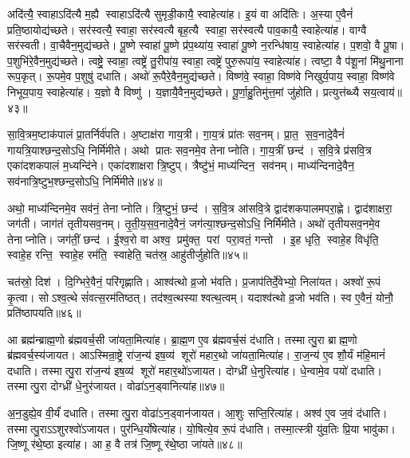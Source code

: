 अदि॑त्यै॒ स्वाहाऽदि॑त्यै म॒ह्यै स्वाहाऽदि॑त्यै सुमृडी॒कायै॒ स्वाहेत्या॑ह। इ॒यं वा अदि॑तिः। अ॒स्या ए॒वैनं॑ प्रति॒ष्ठायोद्य॑च्छते। सर॑स्वत्यै॒ स्वाहा॒ सर॑स्वत्यै बृह॒त्यै स्वाहा॒ सर॑स्वत्यै पाव॒कायै॒ स्वाहेत्या॑ह। वाग्वै सर॑स्वती। वा॒चैवैन॒मुद्य॑च्छते। पू॒ष्णे स्वाहा॑ पू॒ष्णे प्र॑प॒थ्या॑य॒ स्वाहा॑ पू॒ष्णे न॒रन्धि॑षाय॒ स्वाहेत्या॑ह। प॒शवो॒ वै पू॒षा। प॒शुभि॑रे॒वैन॒मुद्य॑च्छते। त्वष्ट्रे॒ स्वाहा॒ त्वष्ट्रे॑ तु॒रीपा॑य॒ स्वाहा॒ त्वष्ट्रे॑ पुरु॒रूपा॑य॒ स्वाहेत्या॑ह। त्वष्टा॒ वै प॑शू॒नां मि॑थु॒नाना रूप॒कृत्। रू॒पमे॒व प॒शुषु॑ दधाति। अथो॑ रू॒पैरे॒वैन॒मुद्य॑च्छते। विष्ण॑वे॒ स्वाहा॒ विष्ण॑वे निखुर्य॒पाय॒ स्वाहा॒ विष्ण॑वे निभूय॒पाय॒ स्वाहेत्या॑ह। य॒ज्ञो वै विष्णु॑। य॒ज्ञायै॒वैन॒मुद्य॑च्छते। पू॒र्णा॒हु॒तिमु॑त्त॒मां जु॑होति। प्रत्युत्त॑ब्ध्यै सय॒त्वाय॑॥४३॥\anuvakamend[य॒च्छ॒ते॒ पु॒रु॒रूपा॑य॒ स्वाहेत्या॑हा॒ष्टौ च॑]

सा॒वि॒त्रम॒ष्टाक॑पालं प्रा॒तर्निर्व॑पति। अ॒ष्टाक्ष॑रा गाय॒त्री। गा॒य॒त्रं प्रा॑तः सव॒नम्। प्रा॒त॒ स॒व॒नादे॒वैनं॑ गायत्रि॒याश्छन्द॒सोऽधि॒ निर्मि॑मीते। अथो प्रातः सव॒नमे॒व तेनाप्नोति। गा॒य॒त्रीं छन्द॑। स॒वि॒त्रे प्र॑सवि॒त्र एका॑दशकपालं म॒ध्यन्दि॑ने। एका॑दशाक्षरा त्रि॒ष्टुप्। त्रैष्टु॑भं॒ माध्य॑न्दिन॒ सव॑नम्। माध्य॑न्दिनादे॒वैन॒ सव॑नात्रि॒ष्टुभ॒श्छन्द॒सोऽधि॒ निर्मि॑मीते॥४४॥

अथो॒ माध्य॑न्दिनमे॒व सव॑नं॒ तेनाप्नोति। त्रि॒ष्टुभं॒ छन्द॑। स॒वि॒त्र आ॑सवि॒त्रे द्वाद॑शकपालमपरा॒ह्णे। द्वाद॑शाक्षरा॒ जग॑ती। जाग॑तं तृतीयसव॒नम्। तृ॒ती॒य॒स॒व॒नादे॒वैनं॒ जग॑त्या॒श्छन्द॒सोऽधि॒ निर्मि॑मीते। अथो॑ तृतीयसव॒नमे॒व तेनाप्नोति। जग॑तीं॒ छन्द॑। ई॒श्व॒रो वा अश्व॒ प्रमु॑क्त॒ परां परा॒वतं॒ गन्तो। इ॒ह धृति॒ स्वाहे॒ह विधृ॑ति॒ स्वाहे॒ह रन्ति॒ स्वाहे॒ह रम॑ति॒ स्वाहेति॒ चत॑स्र॒ आहु॑तीर्जुहोति॥४५॥

चत॑स्रो॒ दिश॑। दि॒ग्भिरे॒वैनं॒ परि॑गृह्णाति। आश्व॑त्थो व्र॒जो भ॑वति। प्र॒जाप॑तिर्दे॒वेभ्यो॒ निला॑यत। अश्वो॑ रू॒पं कृ॒त्वा। सोऽश्व॒त्थे सं॑वत्स॒रम॑तिष्ठत्। तद॑श्व॒त्थस्याश्वत्थ॒त्वम्। यदाश्व॑त्थो व्र॒जो भव॑ति। स्व ए॒वैनं॒ योनौ॒ प्रति॑ष्ठापयति॥४६॥\anuvakamend[त्रि॒ष्टुभ॒श्छन्द॒सोऽधि॒ निर्मि॑मीते जुहोति॒ नव॑ च]

आ ब्रह्म॑न्ब्राह्म॒णो ब्र॑ह्मवर्च॒सी जा॑यता॒मित्या॑ह। ब्रा॒ह्म॒ण ए॒व ब्र॑ह्मवर्च॒सं द॑धाति। तस्मात्पु॒रा ब्राह्म॒णो ब्र॑ह्मवर्च॒स्य॑जायत। आऽस्मिन्रा॒ष्ट्रे रा॑ज॒न्य॑ इष॒व्य॑ शूरो॑ महार॒थो जा॑यता॒मित्या॑ह। रा॒ज॒न्य॑ ए॒व शौ॒र्यं म॑हि॒मानं॑ दधाति। तस्मात्पु॒रा रा॑ज॒न्य॑ इष॒व्य॑ शूरो॑ महार॒थो॑ऽजायत। दोग्ध्री॑ धे॒नुरित्या॑ह। धे॒न्वामे॒व पयो॑ दधाति। तस्मात्पु॒रा दोग्ध्री॑ धे॒नुर॑जायत। वोढा॑ऽन॒ड्वानित्या॑ह॥४७॥

अ॒न॒डुह्ये॒व वी॒र्यं॑ दधाति। तस्मात्पु॒रा वोढा॑ऽन॒ड्वान॑जायत। आ॒शुः सप्ति॒रित्या॑ह। अश्व॑ ए॒व ज॒वं द॑धाति। तस्मात्पु॒राऽऽशुरश्वो॑ऽजायत। पुर॑न्धि॒र्योषेत्या॑ह। यो॒षित्ये॒व रू॒पं द॑धाति। तस्मा॒त्स्त्री यु॑व॒तिः प्रि॒या भावु॑का। जि॒ष्णू र॑थे॒ष्ठा इत्या॑ह। आ ह॒ वै तत्र॑ जि॒ष्णू र॑थे॒ष्ठा जा॑यते॥४८॥

